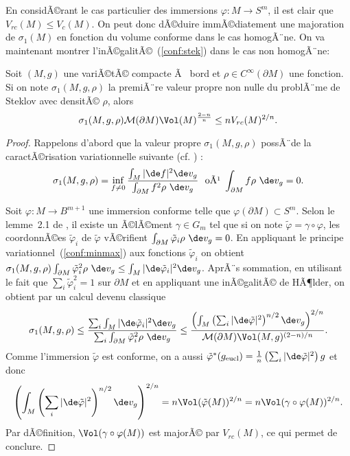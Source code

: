 \documentclass[11pt,a4paper]{smfart}
\begin{document}
En considÃ©rant le cas particulier des
immersions $\varphi:M\to S^m$, il est clair que $V_{rc}(M)\leq V_c(M)$.
On peut donc dÃ©duire immÃ©diatement une majoration de $\sigma_1(M)$ 
en fonction du volume conforme dans le cas homogÃ¨ne. On va maintenant
montrer l'inÃ©galitÃ©~(\ref{conf:stek}) dans le cas non homogÃ¨ne:
\begin{theo}
Soit $(M,g)$ une variÃ©tÃ© compacte Ã  bord et $\rho\in C^\infty(\partial M)$
une fonction. Si on note $\sigma_1(M,g,\rho)$ la premiÃ¨re valeur propre
non nulle du problÃ¨me de Steklov avec densitÃ© $\rho$, alors
$$\sigma_1(M,g,\rho)\mathcal M(\partial M)\Vol(M)^{\frac{2-n}n}\leq 
nV_{rc}(M)^{2/n}.$$
\end{theo}
\begin{proof}
Rappelons d'abord que la valeur propre $\sigma_1(M,g,\rho)$ possÃ¨de la 
caractÃ©risation variationnelle suivante (cf. \cite{ba80}) :
\begin{equation}\label{conf:minmax}
\sigma_1(M,g,\rho)=\inf_{f\neq0}\frac{\int_M|\de f|^2\de v_g}{\int_{\partial M}f^2\rho\ \de v_g}\ \textrm{ oÃ¹ }
\int_{\partial M}f\rho\ \de v_g=0.
\end{equation}

Soit $\varphi : M\to B^{m+1}$ une immersion conforme telle que
$\varphi(\partial M)\subset S^m$. Selon le lemme~2.1 de \cite{esi92}, 
il existe un Ã©lÃ©ment $\gamma\in G_m$ tel que si on note $\tilde\varphi=
\gamma\circ\varphi$, les coordonnÃ©es $\tilde\varphi_i$ de  $\tilde\varphi$
vÃ©rifient $\int_{\partial M}\tilde\varphi_i\rho\ \de v_g=0$.
En appliquant le principe variationnel~(\ref{conf:minmax}) aux fonctions 
$\tilde\varphi_i$ on obtient $\sigma_1(M,g,\rho)
\int_{\partial M}\tilde\varphi_i^2\rho\ \de v_g\leq
\int_M|\de\tilde\varphi_i|^2\de v_g$. AprÃ¨s sommation, en utilisant le fait
que $\sum_i\tilde\varphi_i^2=1$ sur $\partial M$ et en appliquant
une inÃ©galitÃ© de HÃ¶lder, on obtient par un calcul devenu classique
\begin{equation}\label{conf:stekeq1}
\sigma_1(M,g,\rho)\leq\frac{\sum_i\int_M|\de\tilde\varphi_i|^2\de v_g}{\sum_i\int_{\partial M}\tilde\varphi_i^2\rho\ \de v_g}\leq
\frac{\left(\int_M\left(\sum_i|\de\tilde\varphi|^2\right)^{n/2}\de v_g\right)
^{2/n}}{\mathcal M(\partial M)\Vol(M,g)^{(2-n)/n}}.
\end{equation}
Comme l'immersion $\tilde\varphi$ est conforme, on a aussi 
$\tilde\varphi^*(g_\textrm{eucl})=
\frac1n\left(\sum_i|\de\tilde\varphi|^2\right)g$ et donc 
\begin{equation}\label{conf:stekeq2}
\left(\int_M\left(\sum_i|\de\tilde\varphi|^2\right)^{n/2}\de v_g\right)^{2/n}
=n\Vol(\tilde\varphi(M))^{2/n}=n\Vol(\gamma\circ\varphi(M))^{2/n}.
\end{equation}
Par dÃ©finition, $\Vol(\gamma\circ\varphi(M))$ est majorÃ© par $V_{rc}(M)$,
ce qui permet de conclure.
\end{proof}
\end{document}
